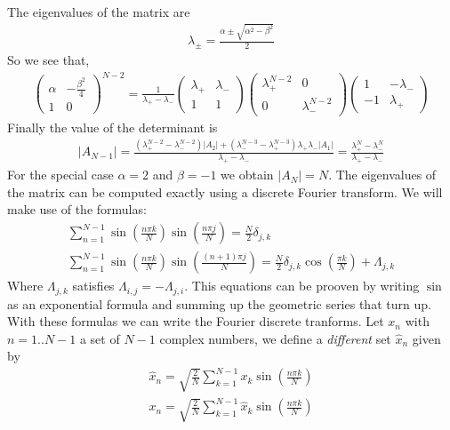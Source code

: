\documentclass[12pt]{article}
\begin{document}
The eigenvalues of the matrix are
\begin{gather}
\lambda_{\pm}=\frac{\alpha\pm\sqrt{\alpha^2-\beta^2}}{2}
\end{gather}
So we see that,
\begin{gather}
\left(\begin{matrix} \alpha & -\frac{\beta^2}{4}\\ 1 & 0\end{matrix}\right)^{N-2}=\frac{1}{\lambda_+-\lambda_-}
\left(\begin{matrix} \lambda_+ & \lambda_- \\ 1 & 1\end{matrix}\right) \left(\begin{matrix} \lambda_+^{N-2} & 0\\ 0 & \lambda_-^{N-2}\end{matrix}\right)
\left(\begin{matrix} 1 & -\lambda_-\\ -1 & \lambda_+\end{matrix}\right)
\end{gather}
Finally the value of the determinant is
\begin{gather}
|A_{N-1}|=\frac{(\lambda_+^{N-2}-\lambda_-^{N-2})|A_2|+(\lambda_-^{N-3}-\lambda_+^{N-3})\lambda_+\lambda_-|A_1|}{\lambda_+-\lambda_-}=\frac{\lambda_+^{N}-\lambda_-^{N}}{\lambda_+-\lambda_-}
\end{gather}
For the special case $\alpha=2$ and $\beta=-1$ we obtain $|A_N|=N$. The eigenvalues of the matrix can be computed exactly using a discrete Fourier transform. We will make use of the formulas:
\begin{gather}
\sum_{n=1}^{N-1}\sin\left(\frac{n\pi k}{N}\right)\sin\left(\frac{n\pi j}{N}\right)=\frac{N}{2}\delta_{j,k} \\
\sum_{n=1}^{N-1}\sin\left(\frac{n\pi k}{N}\right)\sin\left(\frac{(n+1)\pi j}{N}\right)=\frac{N}{2}\delta_{j,k}\cos\left(\frac{\pi k}{N}\right)+\Lambda_{j,k}
\end{gather}
Where $\Lambda_{j,k}$ satisfies $\Lambda_{i,j}=-\Lambda_{j,i}$. This equations can be prooven by writing $\sin$ as an exponential formula and summing up the geometric series that turn up.
With these formulas we can write the Fourier discrete tranforms. Let $x_n$ with $n=1..N-1$ a set of $N-1$ complex numbers, we define a \textit{different} set $\hat x_n$ given by
\begin{gather}
\hat x_n=\sqrt{\frac{2}{N}}\sum_{k=1}^{N-1}x_k\sin\left(\frac{n\pi k}{N}\right) \\
x_n=\sqrt{\frac{2}{N}}\sum_{k=1}^{N-1}\hat x_k\sin\left(\frac{n\pi k}{N}\right)
\end{gather}
\end{document}
